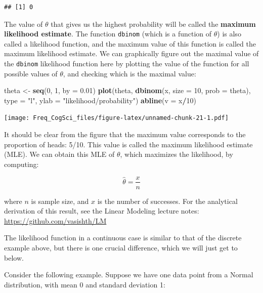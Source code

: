 \documentclass[12pt,]{krantz}
\newenvironment{Shaded}{\begin{snugshade}}{\end{snugshade}}
\newcommand{\DataTypeTok}[1]{\textcolor[rgb]{0.13,0.29,0.53}{#1}}
\newcommand{\DecValTok}[1]{\textcolor[rgb]{0.00,0.00,0.81}{#1}}
\newcommand{\FloatTok}[1]{\textcolor[rgb]{0.00,0.00,0.81}{#1}}
\newcommand{\KeywordTok}[1]{\textcolor[rgb]{0.13,0.29,0.53}{\textbf{#1}}}
\newcommand{\NormalTok}[1]{#1}
\newcommand{\OperatorTok}[1]{\textcolor[rgb]{0.81,0.36,0.00}{\textbf{#1}}}
\newcommand{\StringTok}[1]{\textcolor[rgb]{0.31,0.60,0.02}{#1}}
\begin{document}
\begin{verbatim}
## [1] 0
\end{verbatim}

The value of \(\theta\) that gives us the highest probability will be called the \textbf{maximum likelihood estimate}. The function \texttt{dbinom} (which is a function of \(\theta\)) is also called a likelihood function, and the maximum value of this function is called the maximum likelihood estimate. We can graphically figure out the maximal value of the \texttt{dbinom} likelihood function here by plotting the value of the function for all possible values of \(\theta\), and checking which is the maximal value:

\begin{Shaded}
\begin{Highlighting}[]
\NormalTok{theta <-}\StringTok{ }\KeywordTok{seq}\NormalTok{(}\DecValTok{0}\NormalTok{, }\DecValTok{1}\NormalTok{, }\DataTypeTok{by =} \FloatTok{0.01}\NormalTok{)}
\KeywordTok{plot}\NormalTok{(theta, }\KeywordTok{dbinom}\NormalTok{(x, }\DataTypeTok{size =} \DecValTok{10}\NormalTok{, }\DataTypeTok{prob =}\NormalTok{ theta), }\DataTypeTok{type =} \StringTok{"l"}\NormalTok{, }
  \DataTypeTok{ylab =} \StringTok{"likelihood/probability"}\NormalTok{)}
\KeywordTok{abline}\NormalTok{(}\DataTypeTok{v =}\NormalTok{ x}\OperatorTok{/}\DecValTok{10}\NormalTok{)}
\end{Highlighting}
\end{Shaded}

\texttt{[image: Freq\_CogSci\_files/figure-latex/unnamed-chunk-21-1.pdf]}

It should be clear from the figure that the maximum value corresponds to the proportion of heads: 5/10. This value is called the maximum likelihood estimate (MLE). We can obtain this MLE of \(\theta\), which maximizes the likelihood, by computing:

\begin{equation}
\hat \theta = \frac{x}{n}
\end{equation}

where \(n\) is sample size, and \(x\) is the number of successes. For the analytical derivation of this result, see the Linear Modeling lecture notes:
\url{https://github.com/vasishth/LM}

The likelihood function in a continuous case is similar to that of the discrete example above, but there is one crucial difference, which we will just get to below.

Consider the following example. Suppose we have one data point from a Normal distribution, with mean 0 and standard deviation 1:
\end{document}
